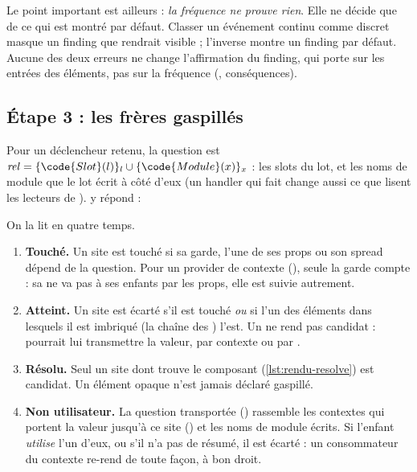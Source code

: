 Le point important est ailleurs : \emph{la fréquence ne prouve rien}. Elle ne décide que de ce qui
est montré par défaut. Classer un événement continu comme discret masque un finding que
 rendrait visible ; l'inverse montre un finding par défaut. Aucune des
deux erreurs ne change l'affirmation du finding, qui porte sur les entrées des éléments, pas sur
la fréquence (, conséquences).

\subsection{Étape 3 : les frères gaspillés}

Pour un déclencheur retenu, la question est
$\mathit{rel} = \{\code{Slot}(l)\}_l \cup \{\code{Module}(x)\}_x$ : les slots du lot, et les noms
de module que le lot écrit à côté d'eux (un handler qui fait  change
aussi ce que lisent les lecteurs de ).  y répond :


On la lit en quatre temps.
\begin{enumerate}
  \item \textbf{Touché.} Un site est touché si sa garde, l'une de ses props ou son spread dépend
        de la question. Pour un provider de contexte (), seule la garde compte :
        sa  ne va pas à ses enfants par les props, elle est suivie autrement.
  \item \textbf{Atteint.} Un site est écarté s'il est touché \emph{ou} si l'un des éléments dans
        lesquels il est imbriqué (la chaîne des ) l'est. Un
         ne rend pas  candidat :
         pourrait lui transmettre la valeur, par contexte ou par .
  \item \textbf{Résolu.} Seul un site dont  trouve le composant
        (\cref{lst:rendu-resolve}) est candidat. Un élément opaque n'est jamais déclaré gaspillé.
  \item \textbf{Non utilisateur.} La question transportée () rassemble les
        contextes qui portent la valeur jusqu'à ce site () et les noms de
        module écrits. Si l'enfant \emph{utilise} l'un d'eux, ou s'il n'a pas de résumé, il est
        écarté : un consommateur du contexte re-rend de toute façon, à bon droit.
\end{enumerate}

